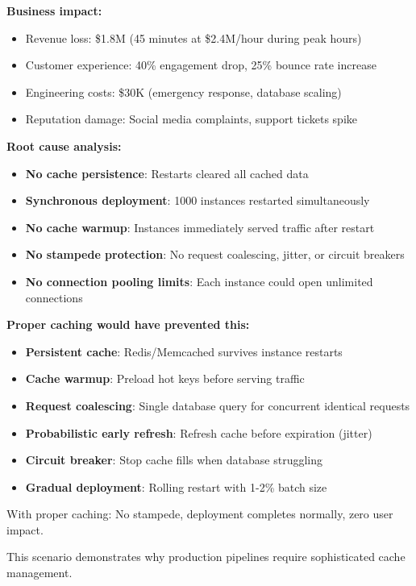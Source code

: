 \textbf{Business impact:}
\begin{itemize}
    \item Revenue loss: \$1.8M (45 minutes at \$2.4M/hour during peak hours)
    \item Customer experience: 40\% engagement drop, 25\% bounce rate increase
    \item Engineering costs: \$30K (emergency response, database scaling)
    \item Reputation damage: Social media complaints, support tickets spike
\end{itemize}

\textbf{Root cause analysis:}
\begin{itemize}
    \item \textbf{No cache persistence}: Restarts cleared all cached data
    \item \textbf{Synchronous deployment}: 1000 instances restarted simultaneously
    \item \textbf{No cache warmup}: Instances immediately served traffic after restart
    \item \textbf{No stampede protection}: No request coalescing, jitter, or circuit breakers
    \item \textbf{No connection pooling limits}: Each instance could open unlimited connections
\end{itemize}

\textbf{Proper caching would have prevented this:}
\begin{itemize}
    \item \textbf{Persistent cache}: Redis/Memcached survives instance restarts
    \item \textbf{Cache warmup}: Preload hot keys before serving traffic
    \item \textbf{Request coalescing}: Single database query for concurrent identical requests
    \item \textbf{Probabilistic early refresh}: Refresh cache before expiration (jitter)
    \item \textbf{Circuit breaker}: Stop cache fills when database struggling
    \item \textbf{Gradual deployment}: Rolling restart with 1-2\% batch size
\end{itemize}

With proper caching: No stampede, deployment completes normally, zero user impact.

This scenario demonstrates why production pipelines require sophisticated cache management.

